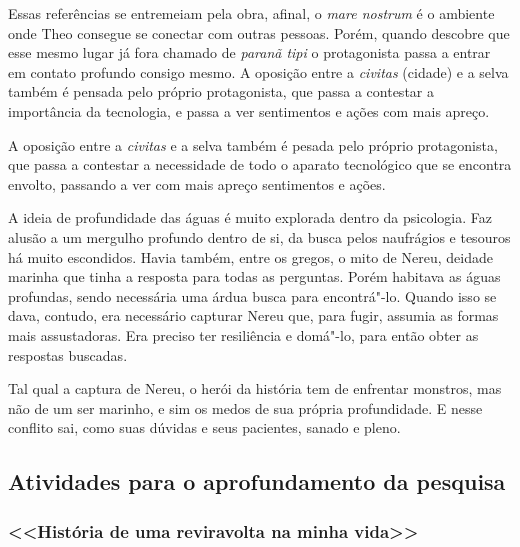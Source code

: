 \documentclass[12pt]{extarticle}
\begin{document}
Essas referências se entremeiam pela obra, afinal, o \emph{mare nostrum} é o
ambiente onde Theo consegue se conectar com outras pessoas.
Porém, quando descobre que esse mesmo lugar já fora chamado de \emph{paranã tipi}  o
protagonista passa a entrar em contato profundo consigo mesmo.
A oposição entre a \textit{civitas} (cidade) e a selva também é pensada pelo próprio
protagonista, que passa a contestar a importância da tecnologia, e passa a
ver sentimentos e ações com mais apreço.


A oposição entre a \emph{civitas} e a selva também é pesada pelo próprio
protagonista, que passa a contestar a necessidade de todo o aparato
tecnológico que se encontra envolto, passando a ver com mais apreço
sentimentos e ações.

A ideia de profundidade das águas é muito explorada dentro da
psicologia. Faz alusão a um mergulho profundo dentro de si, da busca
pelos naufrágios e tesouros há muito escondidos. Havia também, entre os
gregos, o mito de Nereu, deidade marinha que tinha a resposta para todas
as perguntas. Porém habitava as águas profundas, sendo necessária uma
árdua busca para encontrá"-lo. Quando isso se dava, contudo, era
necessário capturar Nereu que, para fugir, assumia as formas mais
assustadoras. Era preciso ter resiliência e domá"-lo, para então obter as
respostas buscadas.

Tal qual a captura de Nereu, o herói da história tem de enfrentar
monstros, mas não de um ser marinho, e sim os medos de sua
própria profundidade. E nesse conflito sai, como suas dúvidas e seus pacientes, sanado e pleno.







\subsection{Atividades para o aprofundamento da pesquisa}

\subsubsection{<<História de uma reviravolta na minha vida>>}
\end{document}
